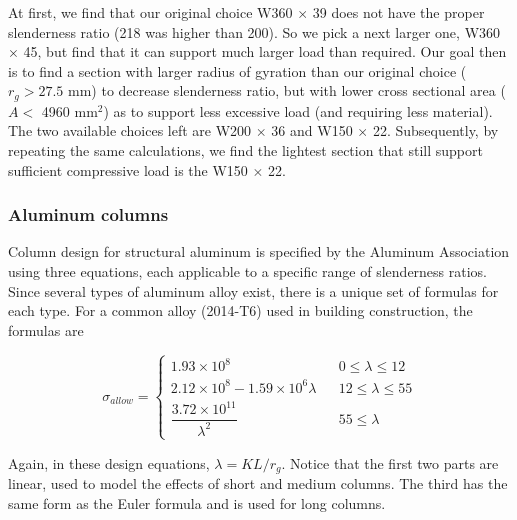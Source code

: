 \documentclass[
10pt,
a4paper,
openany,
svgnames,
]{book}
\begin{document}
\begin{solution}
  At first, we find that our original choice W360 $\times$ 39 does not have the proper slenderness ratio (218 was higher than 200). So we pick a next larger one, W360 $\times$ 45, but find that it can support much larger load than required. Our goal then is to find a section with larger radius of gyration than our original choice ($r_g > 27.5$ mm) to decrease slenderness ratio, but with lower cross sectional area ($A <$ 4960 mm$^2$) as to support less excessive load (and requiring less material). The two available choices left are W200 $\times$ 36 and W150 $\times$ 22. Subsequently, by repeating the same calculations, we find the lightest section that still support sufficient compressive load is the W150 $\times$ 22.
  
\end{solution}

\subsubsection{Aluminum columns}

Column design for structural aluminum is specified by the Aluminum Association using three equations, each applicable to a specific range of slenderness ratios. Since several types of aluminum alloy exist, there is a unique set of formulas for each type. For a common alloy (2014-T6) used in building construction, the formulas are

\begin{equation}
  \sigma_{allow} = \left\{
    \begin{array}{lcc}
      1.93 \times 10^8 &&  0 \leqslant \lambda \leqslant 12 \\[20pt] 
      2.12 \times 10^8 - 1.59 \times 10^6 \lambda && 12 \leqslant \lambda \leqslant 55 \\[20pt]
      \dfrac{3.72 \times 10^{11}}{ \lambda^2 } && 55 \leqslant \lambda 
    \end{array} \right.
\end{equation}

Again, in these design equations, $\lambda = KL/r_g$. Notice that the first two parts are linear, used to model the effects of short and medium columns. The third has the same form as the Euler formula and is used for long columns.
\end{document}
